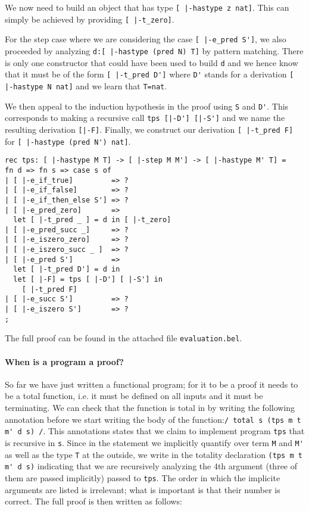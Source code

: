 We now need to build an object that has type
\lstinline![ |-hastype z nat]!. This can simply be achieved by
providing
\lstinline![ |-t_zero]!.


For the step case where we are considering the case
\lstinline![ |-e_pred S']!, we also proceeded by analyzing
\lstinline!d:[ |-hastype (pred N) T]! by pattern matching. There is
only one constructor that could have been used to build \lstinline!d!
and we hence know that it must be of the form
\lstinline![ |-t_pred D']! where \lstinline!D'! stands for a
derivation
\lstinline![ |-hastype N nat]! and we learn that \lstinline!T=nat!.

We then appeal to the induction hypothesis in the proof
using \lstinline!S! and \lstinline!D'!. This corresponds to making a
recursive call \lstinline!tps [|-D'] [|-S']! and we name the resulting
derivation \lstinline![|-F]!. Finally, we construct our derivation
\lstinline![ |-t_pred F]! for \lstinline![ |-hastype (pred N') nat]!.

\begin{lstlisting}
rec tps: [ |-hastype M T] -> [ |-step M M'] -> [ |-hastype M' T] =
fn d => fn s => case s of
| [ |-e_if_true]         => ?
| [ |-e_if_false]        => ?
| [ |-e_if_then_else S'] => ?
| [ |-e_pred_zero]       =>
  let [ |-t_pred _ ] = d in [ |-t_zero]
| [ |-e_pred_succ _]     => ?
| [ |-e_iszero_zero]     => ?
| [ |-e_iszero_succ _ ]  => ?
| [ |-e_pred S']         =>
  let [ |-t_pred D'] = d in
  let [ |-F] = tps [ |-D'] [ |-S'] in
    [ |-t_pred F]
| [ |-e_succ S']         => ?
| [ |-e_iszero S']       => ?
;
\end{lstlisting}

The full proof can be found in the attached file \lstinline!evaluation.bel!.

\paragraph{When is a program a proof?} So far we have just written a
functional program; for it to be a proof it needs to be a total
function, i.e. it must be defined on all inputs and it must be
terminating. We can check that the function is total in \beluga by
writing the following annotation before we start writing the body of
the function:\lstinline!/ total s (tps m t m' d s) /!. This
annotations states that we claim to implement program \lstinline!tps! that is
recursive in \lstinline!s!. Since in the statement we implicitly
quantify over term \lstinline!M! and \lstinline!M'! as well as the
type \lstinline!T! at the outside, we write in the totality
declaration \lstinline!(tps m t m' d s)! indicating that we are
recursively analyzing the 4th argument (three of them are passed
implicitly) passed to \lstinline!tps!. The order in which the
implicite arguments are listed is irrelevant; what is important is
that their number is correct.
The full proof is then written as follows:


